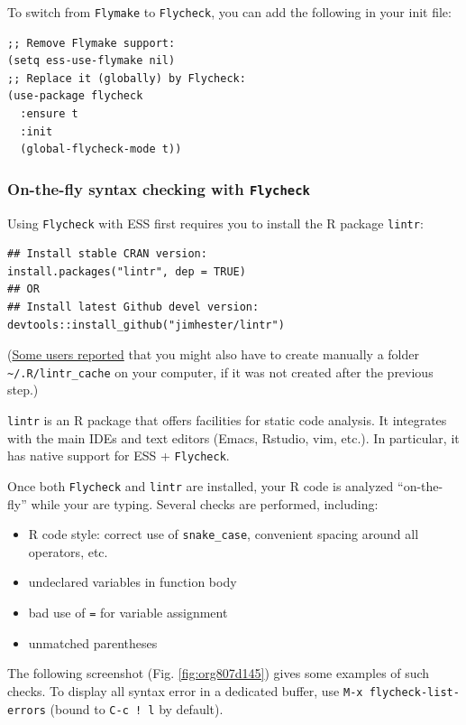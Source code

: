 \documentclass[11pt]{article}
\begin{document}
To switch from \texttt{Flymake} to \texttt{Flycheck}, you can add the following in your init file:

\begin{verbatim}
;; Remove Flymake support:
(setq ess-use-flymake nil)
;; Replace it (globally) by Flycheck:
(use-package flycheck
  :ensure t
  :init
  (global-flycheck-mode t))
\end{verbatim}

\subsubsection{On-the-fly syntax checking with \texttt{Flycheck}}
\label{sec:orgdd1b25c}
Using \texttt{Flycheck} with ESS first requires you to install the R package \texttt{lintr}:

\begin{verbatim}
## Install stable CRAN version:
install.packages("lintr", dep = TRUE)
## OR
## Install latest Github devel version:
devtools::install_github("jimhester/lintr")
\end{verbatim}

(\href{https://emacs.stackexchange.com/questions/53018/flycheck-r-lintr-doesnt-find-anything}{Some users reported} that you might also have to create manually a folder \texttt{\textasciitilde{}/.R/lintr\_cache} on your computer, if it was not created after the previous step.)

\texttt{lintr} is an R package that offers facilities for static code analysis. It integrates with the main IDEs and text editors (Emacs, Rstudio, vim, etc.). In particular, it has native support for ESS + \texttt{Flycheck}.

Once both \texttt{Flycheck} and \texttt{lintr} are installed, your R code is analyzed ``on-the-fly'' while your are typing. Several checks are performed, including:
\begin{itemize}
\item R code style: correct use of \texttt{snake\_case}, convenient spacing around all operators, etc.
\item undeclared variables in function body
\item bad use of \texttt{=} for variable assignment
\item unmatched parentheses
\end{itemize}

The following screenshot (Fig. \ref{fig:org807d145}) gives some examples of such checks. To display all syntax error in a dedicated buffer, use \texttt{M-x flycheck-list-errors} (bound to \texttt{C-c ! l} by default).
\end{document}
